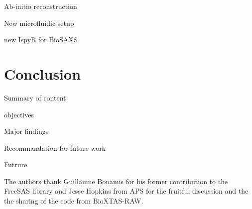 \documentclass[preprint]{iucr}              %
\begin{document}
Ab-initio reconstruction

New microfluidic setup

new IspyB for BioSAXS

\section{Conclusion}

Summary of content

objectives

Major findings 

Recommandation for future work

Futrure 

The authors thank Guillaume Bonamis for his former contribution to the FreeSAS library and Jesse Hopkins from APS for the fruitful 
discussion and the the sharing of the code from BioXTAS-RAW.





\end{document}
